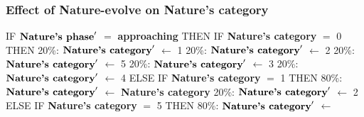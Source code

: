 \documentclass{article}%
\begin{document}
\subsubsection{Effect of Nature{-}evolve on Nature's category}%
\label{ssubsec:Effect of Nature{-}evolve on Nature's category}%
\begin{flushleft}%
IF %
$\mbox{\textbf{Nature's phase}} '$%
$=$%
\textbf{approaching}%
\linebreak%
\hspace*{2em}%
THEN %
IF %
\textbf{Nature's category}%
$=$%
0%
\linebreak%
\hspace*{4em}%
THEN %
\linebreak%
\hspace*{6em}%
20\%: %
$\mbox{\textbf{Nature's category}} '$%
$\leftarrow$%
1%
\linebreak%
\hspace*{6em}%
20\%: %
$\mbox{\textbf{Nature's category}} '$%
$\leftarrow$%
2%
\linebreak%
\hspace*{6em}%
20\%: %
$\mbox{\textbf{Nature's category}} '$%
$\leftarrow$%
5%
\linebreak%
\hspace*{6em}%
20\%: %
$\mbox{\textbf{Nature's category}} '$%
$\leftarrow$%
3%
\linebreak%
\hspace*{6em}%
20\%: %
$\mbox{\textbf{Nature's category}} '$%
$\leftarrow$%
4%
\linebreak%
\hspace*{4em}%
ELSE %
IF %
\textbf{Nature's category}%
$=$%
1%
\linebreak%
\hspace*{6em}%
THEN %
\linebreak%
\hspace*{8em}%
80\%: %
$\mbox{\textbf{Nature's category}} '$%
$\leftarrow$%
\textbf{Nature's category}%
\linebreak%
\hspace*{8em}%
20\%: %
$\mbox{\textbf{Nature's category}} '$%
$\leftarrow$%
2%
\linebreak%
\hspace*{6em}%
ELSE %
IF %
\textbf{Nature's category}%
$=$%
5%
\linebreak%
\hspace*{8em}%
THEN %
\linebreak%
\hspace*{10em}%
80\%: %
$\mbox{\textbf{Nature's category}} '$%
$\leftarrow$%

\end{flushleft}
\end{document}
